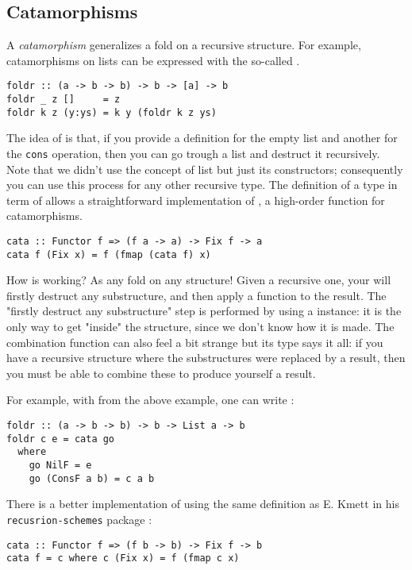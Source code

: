 \subsection{Catamorphisms}
A \emph{catamorphism} generalizes a fold on a recursive structure. For example, catamorphisms on lists can be expressed with the so-called .
\begin{verbatim}
foldr :: (a -> b -> b) -> b -> [a] -> b
foldr _ z []     = z
foldr k z (y:ys) = k y (foldr k z ys)
\end{verbatim}
The idea of  is that, if you provide a definition for the empty list and another for the \verb|cons| operation, then you can go trough a list and destruct it recursively. Note that we didn't use the concept of list but just its constructors; consequently you can use this process for any other recursive type. The definition of a type in term of  allows a straightforward implementation of , a high-order function for catamorphisms.

\begin{verbatim}
cata :: Functor f => (f a -> a) -> Fix f -> a
cata f (Fix x) = f (fmap (cata f) x)
\end{verbatim}
\noindent How  is working? As any fold on any structure! Given a recursive one, your will firstly destruct any substructure, and then apply a function to the result. The "firstly destruct any substructure" step is performed by using a  instance: it is the only way to get "inside" the structure, since we don't know how it is made. The combination function can also feel a bit strange but its type says it all: if you have a recursive structure where the substructures were replaced by a result, then you must be able to combine these to produce yourself a result.

For example, with  from the above example, one can write :
\begin{verbatim}
foldr :: (a -> b -> b) -> b -> List a -> b
foldr c e = cata go
  where
    go NilF = e
    go (ConsF a b) = c a b
\end{verbatim}

\noindent There is a better implementation of  using the same definition as E. Kmett in his \verb|recusrion-schemes| package \cite{ekmett:eschems}:

\begin{verbatim}
cata :: Functor f => (f b -> b) -> Fix f -> b
cata f = c where c (Fix x) = f (fmap c x)
\end{verbatim}

